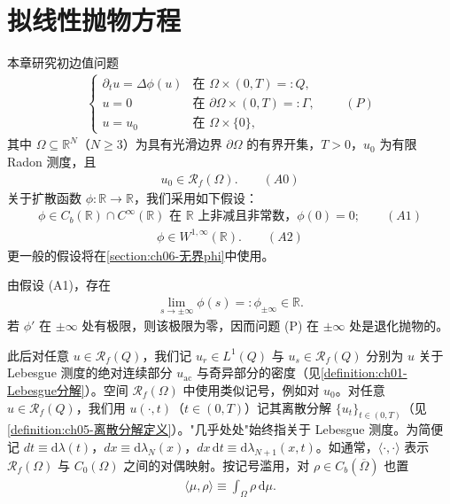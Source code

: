 ﻿\documentclass[../main.tex]{subfiles}
\begin{document}
\chapter{拟线性抛物方程}\label{chapter:ch06}

本章研究初边值问题
\begin{align*}
\begin{cases}
\partial_t u = \Delta\phi(u) & \text{在 }\Omega\times(0,T)=:Q,\\
u=0 & \text{在 }\partial\Omega\times(0,T)=:\Gamma,\\
u=u_0 & \text{在 }\Omega\times\{0\},
\end{cases}
\qquad(P)
\end{align*}
其中 $\Omega\subseteq\mathbb{R}^N$（$N\geqslant3$）为具有光滑边界 $\partial\Omega$ 的有界开集，$T>0$，$u_0$ 为有限 Radon 测度，且
\begin{align*}
u_0\in\mathscr{R}_f(\Omega). \qquad(A0)
\end{align*}
关于扩散函数 $\phi:\mathbb{R}\to\mathbb{R}$，我们采用如下假设：
\begin{align*}
\phi\in C_b(\mathbb{R})\cap C^\infty(\mathbb{R}) \text{ 在 }\mathbb{R}\text{ 上非减且非常数，}\phi(0)=0; \qquad(A1)
\end{align*}
\begin{align*}
\phi\in W^{1,\infty}(\mathbb{R}). \qquad(A2)
\end{align*}
更一般的假设将在\cref{section:ch06-无界phi}中使用。

由假设 (A1)，存在
\begin{align}
\lim_{s\to\pm\infty}\phi(s)=:\phi_{\pm\infty}\in\mathbb{R}. \label{align:ch6-6.1}
\end{align}
若 $\phi'$ 在 $\pm\infty$ 处有极限，则该极限为零，因而问题 (P) 在 $\pm\infty$ 处是退化抛物的。

此后对任意 $u\in\mathscr{R}_f(Q)$，我们记 $u_r\in L^1(Q)$ 与 $u_s\in\mathscr{R}_f(Q)$ 分别为 $u$ 关于 Lebesgue 测度的绝对连续部分 $u_{\mathrm{ac}}$ 与奇异部分的密度（见\cref{definition:ch01-Lebesgue分解}）。空间 $\mathscr{R}_f(\Omega)$ 中使用类似记号，例如对 $u_0$。对任意 $u\in\mathscr{R}_f(Q)$，我们用 $u(\cdot,t)$（$t\in(0,T)$）记其离散分解 $\{u_t\}_{t\in(0,T)}$（见\cref{definition:ch05-离散分解定义}）。"几乎处处"始终指关于 Lebesgue 测度。为简便记 $dt\equiv\mathrm{d}\lambda(t)$，$dx\equiv\mathrm{d}\lambda_N(x)$，$dx\,\mathrm{d}t\equiv\mathrm{d}\lambda_{N+1}(x,t)$。如通常，$\langle\cdot,\cdot\rangle$ 表示 $\mathscr{R}_f(\Omega)$ 与 $C_0(\Omega)$ 之间的对偶映射。按记号滥用，对 $\rho\in C_b(\overline\Omega)$ 也置
\begin{align*}
\langle\mu,\rho\rangle\equiv\int_\Omega\rho\,\mathrm{d}\mu.
\end{align*}
\end{document}
